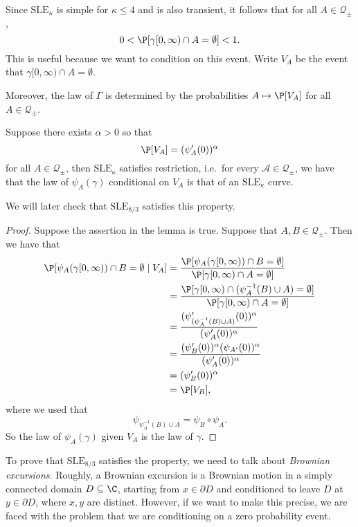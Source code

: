 \documentclass[a4paper]{article}
\newcommand\SLE{\mathrm{SLE}}
\begin{document}
Since $\SLE_\kappa$ is simple for $\kappa \leq 4$ and is also transient, it follows that for all $A \in \mathcal{Q}_{\pm}$,
\[
  0 < \P[\gamma[0, \infty) \cap A = \emptyset] < 1.
\]
This is useful because we want to condition on this event. Write $V_A$ be the event that $\gamma[0, \infty) \cap A = \emptyset$.

Moreover, the law of $\Gamma$ is determined by the probabilities $A \mapsto \P[V_A]$ for all $A \in \mathcal{Q}_{\pm}$.

\begin{lemma}
  Suppose there exists $\alpha > 0$ so that
  \[
    \P[V_A] = (\psi_A'(0))^\alpha
  \]
  for all $A \in \mathcal{Q}_{\pm}$, then $\SLE_\kappa$ satisfies restriction, i.e.\ for every $\mathcal{A} \in \mathcal{Q}_{\pm}$, we have that the law of $\psi_A(\gamma)$ conditional on $V_A$ is that of an $\SLE_\kappa$ curve.
\end{lemma}

We will later check that $\SLE_{8/3}$ satisfies this property.

\begin{proof}
  Suppose the assertion in the lemma is true. Suppose that $A, B \in \mathcal{Q}_{\pm}$. Then we have that
  \begin{align*}
        \P[\psi_A(\gamma[0, \infty)) \cap B = \emptyset \mid V_A] &= \frac{\P [\psi_A(\gamma[0, \infty)) \cap B = \emptyset]}{\P[\gamma[0, \infty) \cap A = \emptyset]}\\
    &= \frac{\P[\gamma[0, \infty) \cap (\psi_A^{-1}(B) \cup A) = \emptyset]}{\P[\gamma[0, \infty) \cap A = \emptyset]}\\
    &= \frac{(\psi_{(\psi_A^{-1}(B) \cup A)}'(0))^\alpha}{(\psi_A'(0))^\alpha}\\
    &= \frac{(\psi_B'(0))^\alpha (\psi_{A'}(0))^\alpha}{(\psi_A'(0))^\alpha}\\
    &= (\psi_B'(0))^\alpha\\
    &= \P[V_B],
  \end{align*}
  where we used that
  \[
    \psi_{\psi_A^{-1}(B) \cup A} = \psi_B \circ \psi_A.
  \]
  So the law of $\psi_A(\gamma)$ given $V_A$ is the law of $\gamma$.
\end{proof}

To prove that $\SLE_{8/3}$ satisfies the property, we need to talk about \emph{Brownian excursions}. Roughly, a Brownian excursion is a Brownian motion in a simply connected domain $D \subseteq \C$, starting from $x \in \partial D$ and conditioned to leave $D$ at $y \in \partial D$, where $x, y$ are distinct. However, if we want to make this precise, we are faced with the problem that we are conditioning on a zero probability event.
\end{document}
